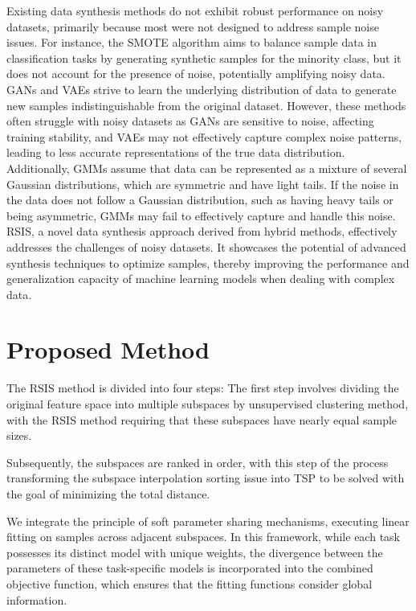 \documentclass[final,3p,times]{elsarticle}
\begin{document}
Existing data synthesis methods do not exhibit robust performance 
on noisy datasets, primarily because most were not designed to 
address sample noise issues. {For instance, the SMOTE algorithm aims to balance sample data in classification tasks by generating synthetic samples for the minority class, but it does not account for the presence of noise, potentially amplifying noisy data. GANs and VAEs strive to learn the underlying distribution of data to generate new samples indistinguishable from the original dataset. However, these methods often struggle with noisy datasets as GANs are sensitive to noise, affecting training stability, and VAEs may not effectively capture complex noise patterns, leading to less accurate representations of the true data distribution. Additionally, GMMs assume that data can be represented as a mixture of several Gaussian distributions, which are symmetric and have light tails. If the noise in the data does not follow a Gaussian distribution, such as having heavy tails or being asymmetric, GMMs may fail to effectively capture and handle this noise.} RSIS, a 
novel data synthesis approach derived from hybrid methods, effectively addresses the challenges of noisy 
datasets. It showcases the potential of advanced synthesis techniques 
to optimize samples, thereby improving the performance and 
generalization capacity of machine learning models when dealing 
with complex data.






\section{Proposed Method}
The RSIS method is divided into four steps: The first step involves 
dividing the original feature space into multiple subspaces by 
unsupervised clustering method, with the RSIS method requiring 
that these subspaces have nearly equal sample sizes. 

Subsequently, the subspaces are ranked in order, with this step of 
the process transforming the subspace interpolation sorting issue 
into TSP to be solved with the goal of 
minimizing the total distance. 

We integrate the principle of soft parameter sharing mechanisms, 
executing linear fitting on samples across adjacent subspaces. In 
this framework, while each task possesses its distinct model with 
unique weights, the divergence between the parameters of these 
task-specific models is incorporated into the combined objective 
function, which ensures that the fitting functions consider 
global information.
\end{document}
